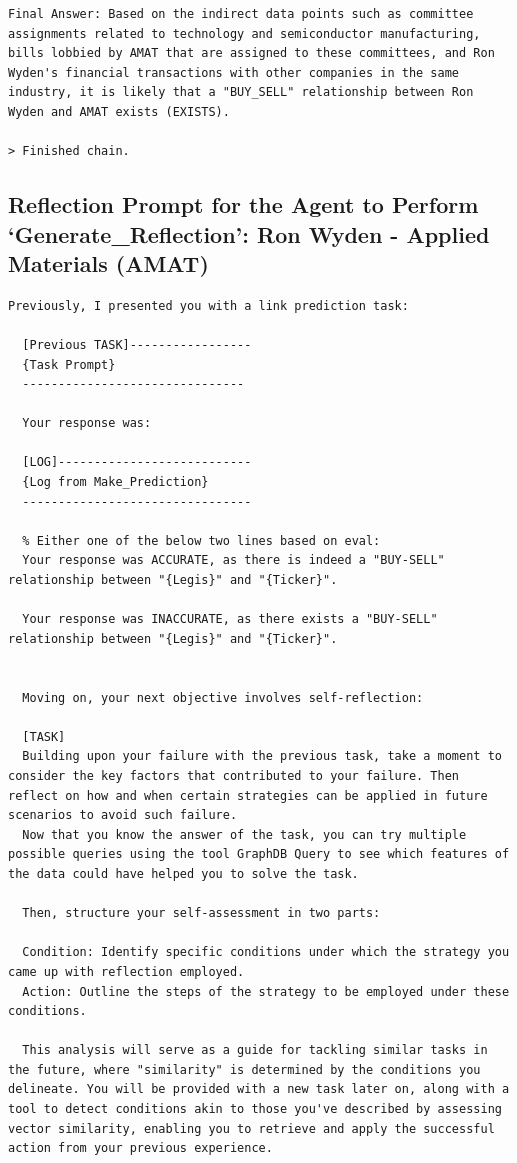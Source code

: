 \documentclass[15pt,letterpaper]{article}
\begin{document}
\begin{Verbatim}[breaklines=true, frame=single]
Final Answer: Based on the indirect data points such as committee assignments related to technology and semiconductor manufacturing, bills lobbied by AMAT that are assigned to these committees, and Ron Wyden's financial transactions with other companies in the same industry, it is likely that a "BUY_SELL" relationship between Ron Wyden and AMAT exists (EXISTS).

> Finished chain.
\end{Verbatim}

\subsection*{Reflection Prompt for the Agent to Perform `Generate\_Reflection': Ron Wyden - Applied Materials (AMAT)}\label{app:log:reflect_prompt}
\begin{Verbatim}[breaklines=true, frame=single]
  Previously, I presented you with a link prediction task:

  [Previous TASK]-----------------
  {Task Prompt}
  -------------------------------

  Your response was:

  [LOG]---------------------------
  {Log from Make_Prediction}
  --------------------------------

  % Either one of the below two lines based on eval:
  Your response was ACCURATE, as there is indeed a "BUY-SELL" relationship between "{Legis}" and "{Ticker}".

  Your response was INACCURATE, as there exists a "BUY-SELL" relationship between "{Legis}" and "{Ticker}".  


  Moving on, your next objective involves self-reflection:

  [TASK]
  Building upon your failure with the previous task, take a moment to consider the key factors that contributed to your failure. Then reflect on how and when certain strategies can be applied in future scenarios to avoid such failure. 
  Now that you know the answer of the task, you can try multiple possible queries using the tool GraphDB Query to see which features of the data could have helped you to solve the task.

  Then, structure your self-assessment in two parts:

  Condition: Identify specific conditions under which the strategy you came up with reflection employed.
  Action: Outline the steps of the strategy to be employed under these conditions.

  This analysis will serve as a guide for tackling similar tasks in the future, where "similarity" is determined by the conditions you delineate. You will be provided with a new task later on, along with a tool to detect conditions akin to those you've described by assessing vector similarity, enabling you to retrieve and apply the successful action from your previous experience.


\end{Verbatim}
\end{document}
